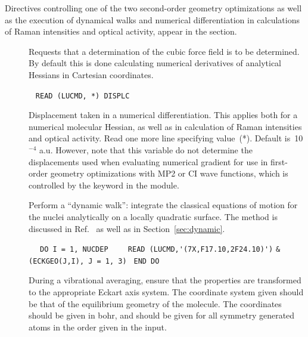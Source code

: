 Directives controlling one of the two second-order
geometry
optimizations  as well as the
execution of dynamical walks and numerical
differentiation in
calculations of Raman intensities and optical activity,
appear in the  section.

\begin{description}
\item[]
Requests that a determination of the cubic force field is to be determined. 
By default this is done calculating numerical derivatives of analytical 
Hessians in Cartesian coordinates. 

\item[]\verb| |\newline
\verb|READ (LUCMD, *) DISPLC|

Displacement taken in a numerical differentiation. This applies both for a numerical molecular
Hessian, as well as in calculation of Raman
intensities and optical activity.
Read one more
line specifying value~(*).  Default is~10$^{-4}$ a.u. However,
note that this variable do not determine the displacements used
when evaluating numerical gradient for use in first-order geometry
optimizations with MP2 or CI wave
functions, which is controlled by the  keyword in the
 module.

\item[]
Perform a ``dynamic walk'': integrate the
classical equations of motion for the nuclei
analytically on a locally
quadratic surface. The method is discussed in
Ref.~\cite{theuhjajcpl173} as well as in Section~\ref{sec:dynamic}.

\item[]\verb| |\newline
\verb| DO I = 1, NUCDEP|\newline
\verb|    READ (LUCMD,'(7X,F17.10,2F24.10)')|\newline
\verb|&        (ECKGEO(J,I), J = 1, 3)|\newline
\verb| END DO|

During a vibrational averaging, ensure that the properties are
transformed to the appropriate Eckart axis system.  The coordinate
system given should be that of the equilibrium geometry of the
molecule. The coordinates should be given in bohr, and should be given
for all symmetry generated atoms in the order given in the input.


\end{description}
